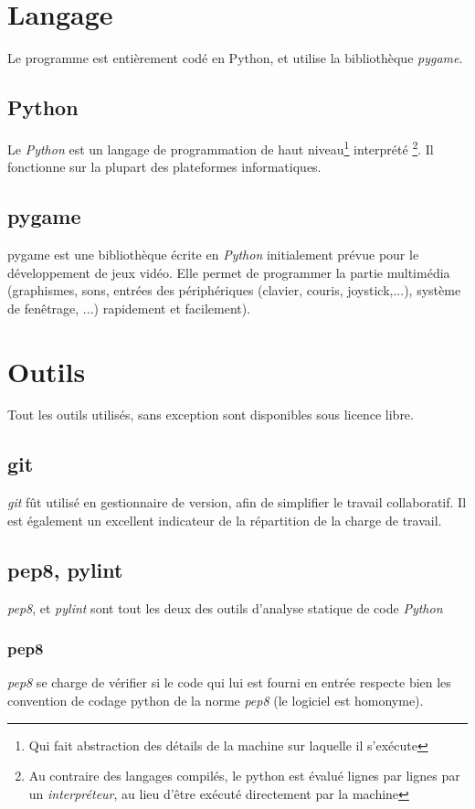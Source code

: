 \section{Langage}
    Le programme est entièrement codé en Python,
    et utilise la bibliothèque \emph{pygame}.
    \subsection{Python}
        Le \emph{Python} est un langage de programmation de haut niveau\footnote{Qui fait
        abstraction des détails de la machine sur laquelle il s'exécute} interprété
        \footnote{Au contraire des langages compilés, le python est évalué
        lignes par lignes par un \emph{interpréteur}, au lieu d'être exécuté directement
        par la machine}. Il fonctionne sur la plupart des plateformes informatiques.
    \subsection{pygame}
        pygame est une bibliothèque écrite en \emph{Python} initialement prévue pour
        le développement de jeux vidéo. Elle permet de programmer la partie multimédia
        (graphismes, sons, entrées des périphériques (clavier, couris, joystick,...),
        système de fenêtrage, ...) rapidement et facilement).

\section{Outils}
    Tout les outils utilisés, sans exception sont disponibles sous
    licence libre.
    \subsection{git}
        \emph{git} fût utilisé en gestionnaire de version,
        afin de simplifier le travail collaboratif.
        Il est également un excellent indicateur de la répartition
        de la charge de travail.
    \subsection{pep8, pylint}
        \emph{pep8}, et \emph{pylint} sont tout les deux
        des outils d'analyse statique de code \emph{Python}
        \subsubsection{pep8}
            \emph{pep8} se charge de vérifier si le code qui lui
            est fourni en entrée respecte bien les convention de codage
            python de la norme \emph{pep8} (le logiciel est homonyme).
